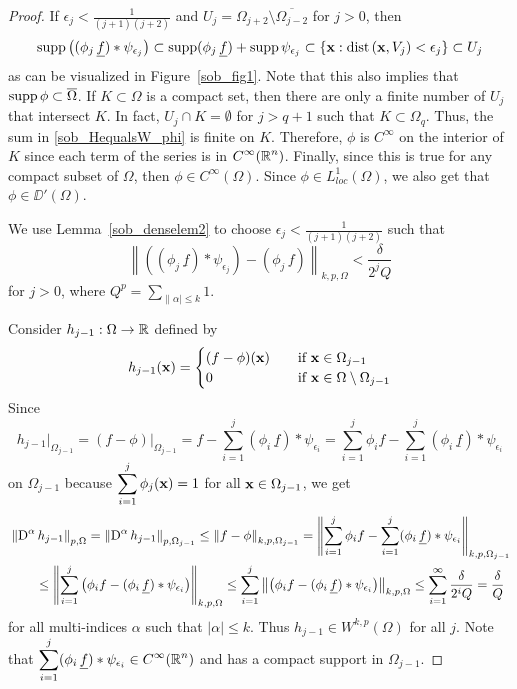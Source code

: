 \begin{proof}
If $\displaystyle \epsilon_j < \frac{1}{(j+1)(j+2)}$ and 
$\displaystyle U_j = \Omega_{j+2} \setminus \overline{\Omega_{j-2}}$
for $j>0$, then
\[
\operatorname{supp} \left( (\phi_j\,\underline{f}) \ast \psi_{\epsilon_j}\right) \subset 
\operatorname{supp} (\phi_j\,\underline{f}) + \operatorname{supp} \psi_{\epsilon_j}
\subset \left\{ \mathbf{x} : \mathrm{dist}\left(\mathbf{x},V_j\right) < \epsilon_j \right\}
\subset U_j
\]
as can be visualized in Figure~\ref{sob_fig1}.  Note that this
also implies that $\operatorname{supp} \phi \subset \overline{\Omega}$.  If
$K \subset \Omega$ is a compact set, then there are only a finite
number of $U_j$ that intersect $K$.  In fact, $U_j \cap K = \emptyset$
for $j > q+1$ such that $K \subset \Omega_q$.  Thus, the
sum in \ref{sob_HequalsW_phi} is finite on $K$.  Therefore, $\phi$ is
$\displaystyle C^\infty$ on the interior of $K$ since each term of the
series is in $\displaystyle C^\infty(\mathbb{R}^n)$.  Finally, since this is true
for any compact subset of $\Omega$, then
$\displaystyle \phi \in C^\infty(\Omega)$.
Since $\displaystyle \phi \in L^1_{loc}(\Omega)$, we also get that
$\phi \in \DD'(\Omega)$.

We use Lemma~\ref{sob_denselem2} to choose
$\displaystyle \epsilon_j < \frac{1}{(j+1)(j+2)}$ such that
\[
\left\| \left( (\phi_j\,\underline{f}) \ast \psi_{\epsilon_j}\right)
- (\phi_j\,f) \right\|_{k,p,\Omega}  < \frac{\delta}{2^j Q}
\]
for $j>0$, where $\displaystyle Q^p = \sum_{\|\alpha|\leq k} 1$.

Consider $h_{j-1}:\Omega \to \mathbb{R}$ defined by
\[
h_{j-1}(\mathbf{x}) = \begin{cases}
(f-\phi)(\mathbf{x}) & \quad \text{if} \ \mathbf{x} \in \Omega_{j-1} \\
0 & \quad \text{if} \ \mathbf{x} \in \Omega \setminus \Omega_{j-1}
\end{cases}
\]
Since
\[
h_{j-1}\big|_{\Omega_{j-1}} = (f - \phi)\big|_{\Omega_{j-1}}
= f - \sum_{i=1}^j (\phi_i\,\underline{f}) \ast \psi_{\epsilon_i}
= \sum_{i=1}^j \phi_i f -
\sum_{i=1}^j (\phi_i\,\underline{f}) \ast \psi_{\epsilon_i}
\]
on $\Omega_{j-1}$ because $\displaystyle \sum_{i=1}^j \phi_j(\mathbf{x}) =1$ for
all $\mathbf{x}\in \Omega_{j-1}$, we get
\begin{align}
&\left\|\operatorname{D}^\alpha h_{j-1}\right\|_{p,\Omega}
= \left\|\operatorname{D}^\alpha h_{j-1}\right\|_{p,\Omega_{j-1}}
\leq \left\| f - \phi \right\|_{k,p,\Omega_{j-1}}
= \left\| \sum_{i=1}^j \phi_i f -
\sum_{i=1}^j (\phi_i\,\underline{f}) \ast \psi_{\epsilon_i}
\right\|_{k,p,\Omega_{j-1}} \nonumber \\
&\qquad \leq \left\| \sum_{i=1}^j \left( \phi_i f -
(\phi_i\,\underline{f}) \ast \psi_{\epsilon_i} \right) \right\|_{k,p,\Omega}
\leq \sum_{i=1}^j \left\| \left( \phi_i f -
(\phi_i\,\underline{f}) \ast \psi_{\epsilon_i} \right) \right\|_{k,p,\Omega}
\leq \sum_{i=1}^\infty \frac{\delta}{2^i Q} = \frac{\delta}{Q}
\label{HequalsWEq1}
\end{align}
for all multi-indices $\alpha$ such that $|\alpha| \leq k$.
Thus $\displaystyle h_{j-1} \in W^{k,p}(\Omega)$ for all $j$.
Note that
$\displaystyle \sum_{i=1}^j (\phi_i\,\underline{f}) \ast \psi_{\epsilon_i}
\in C^{\infty}(\mathbb{R}^n)$ and has a compact support in $\Omega_{j-1}$.


\end{proof}
